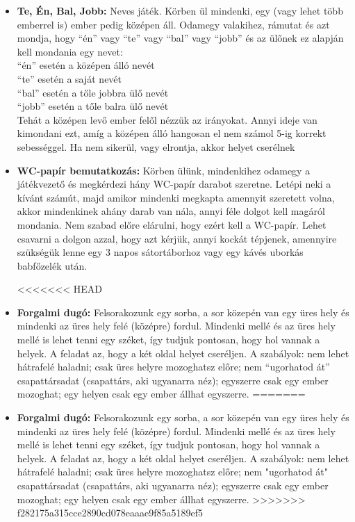 \documentclass[a4paper, 12pt, twoside, openright]{article}
\begin{document}
\begin{itemize}
\item \textbf{Te, Én, Bal, Jobb:} Neves játék. Körben ül mindenki, egy (vagy lehet több emberrel is) ember pedig középen áll. Odamegy valakihez, rámutat és azt mondja, hogy ``én'' vagy ``te'' vagy ``bal'' vagy ``jobb'' és az ülőnek ez alapján kell mondania egy nevet:\\
``én'' esetén a középen álló nevét\\
``te'' esetén a saját nevét\\
``bal'' esetén a tőle jobbra ülő nevét\\
``jobb'' esetén a tőle balra ülő nevét\\
Tehát a középen levő ember felől nézzük az irányokat. Annyi ideje van kimondani ezt, amíg a középen álló hangosan el nem számol 5-ig korrekt sebességgel. Ha nem sikerül, vagy elrontja, akkor helyet cserélnek

\item \textbf{WC-papír bemutatkozás:} Körben ülünk, mindenkihez odamegy a játékvezető és megkérdezi hány WC-papír darabot szeretne. Letépi neki a kívánt számút, majd amikor mindenki megkapta amennyit szeretett volna, akkor mindenkinek ahány darab van nála, annyi féle dolgot kell magáról mondania. Nem szabad előre elárulni, hogy ezért kell a WC-papír. Lehet csavarni a dolgon azzal, hogy azt kérjük, annyi kockát tépjenek, amennyire szükségük lenne egy 3 napos sátortáborhoz vagy egy kávés uborkás babfőzelék után.

<<<<<<< HEAD
\item \textbf{Forgalmi dugó:} Felsorakozunk egy sorba, a sor közepén van egy üres hely és mindenki az üres hely felé (középre) fordul. Mindenki mellé és az üres hely mellé is lehet tenni egy széket, így tudjuk pontosan, hogy hol vannak a helyek. A feladat az, hogy a két oldal helyet cseréljen. A szabályok: nem lehet hátrafelé haladni; csak üres helyre mozoghatsz előre; nem ``ugorhatod át'' csapattársadat (csapattárs, aki ugyanarra néz); egyszerre csak egy ember mozoghat; egy helyen csak egy ember állhat egyszerre.
=======
\item \textbf{Forgalmi dugó:} Felsorakozunk egy sorba, a sor közepén van egy üres hely és mindenki az üres hely felé (középre) fordul. Mindenki mellé és az üres hely mellé is lehet tenni egy széket, így tudjuk pontosan, hogy hol vannak a helyek. A feladat az, hogy a két oldal helyet cseréljen. A szabályok: nem lehet hátrafelé haladni; csak üres helyre mozoghatsz előre; nem "ugorhatod át" csapattársadat (csapattárs, aki ugyanarra néz); egyszerre csak egy ember mozoghat; egy helyen csak egy ember állhat egyszerre.
>>>>>>> f282175a315cce2890cd078eaaae9f85a5189ef5


\end{itemize}
\end{document}
